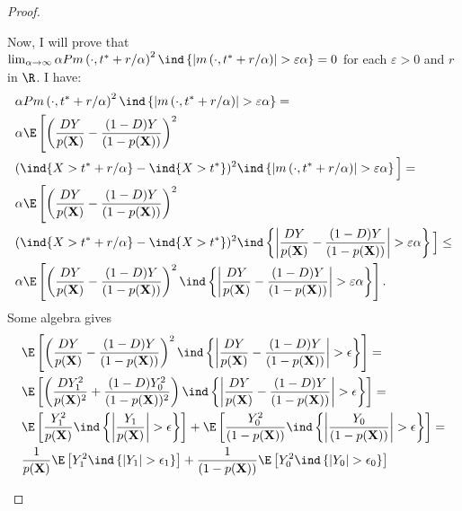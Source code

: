 {\begin{proof}
\begin{enumerate}
    Now, I will prove that $\lim _{\alpha \rightarrow \infty} \alpha P m\left(\cdot, t^* +r / \alpha\right)^2\ind \left\{\left|m\left(\cdot, t^*+r / \alpha\right)\right|>\varepsilon \alpha\right\}=0$ for each $\varepsilon>0$ and $r$ in $\R$. I have:
    \begin{align}
        & \alpha P m\left(\cdot, t^* +r / \alpha\right)^2 \ind\left\{\left|m\left(\cdot, t^*+r / \alpha\right)\right|>\varepsilon \alpha\right\} = \\
        & \alpha \E \left[ \left(\frac{DY}{p(\textbf{X})} - \frac{(1-D) Y}{(1-p(\textbf{X}))}\right)^2 \right. \\
        &(\ind\{X>t^*+r/ \alpha \} -\ind\{X>t^* \})^2 \ind\left\{\left|m\left(\cdot, t^*+r / \alpha\right)\right|>\varepsilon \alpha\right\} \Big] = \\
        &\alpha \E \left[ \left(\frac{DY}{p(\textbf{X})} - \frac{(1-D) Y}{(1-p(\textbf{X}))}\right)^2 \right. \\
        &(\ind\{X>t^*+r/ \alpha \} -\ind\{X>t^* \})^2
         \ind\left\{\left|\frac{DY}{p(\textbf{X})} - \frac{(1-D) Y}{(1-p(\textbf{X}))} \right|>\varepsilon \alpha\right\} \Big]\leq \\
        &\alpha \E \left[ \left(\frac{DY}{p(\textbf{X})} - \frac{(1-D) Y}{(1-p(\textbf{X}))}\right)^2 
         \ind\left\{\left|\frac{DY}{p(\textbf{X})} - \frac{(1-D) Y}{(1-p(\textbf{X}))} \right|>\varepsilon \alpha\right\} \right].
    \end{align}
    Some algebra gives
    \begin{align}
        & \E \left[ \left(\frac{DY}{p(\textbf{X})} - \frac{(1-D) Y}{(1-p(\textbf{X}))}\right)^2 \ind\left\{\left|\frac{DY}{p(\textbf{X})} - \frac{(1-D) Y}{(1-p(\textbf{X}))} \right|> \epsilon \right\} \right] = \\
        & \E \left[ \left(\frac{DY_1^2}{p(\textbf{X})^2} + \frac{(1-D) Y_0^2}{(1-p(\textbf{X}))^2}\right) \ind\left\{\left|\frac{DY}{p(\textbf{X})} - \frac{(1-D) Y}{(1-p(\textbf{X}))} \right|> \epsilon \right\} \right] = \\
        & \E \left[ \frac{Y_1^2}{p(\textbf{X})} \ind\left\{\left|\frac{Y_1}{p(\textbf{X})} \right|> \epsilon \right\} \right] + \E \left[  \frac{ Y_0^2}{(1-p(\textbf{X}))} \ind\left\{\left| \frac{ Y_0}{(1-p(\textbf{X}))} \right|> \epsilon \right\} \right] =\\
        & \frac{1}{p(\textbf{X})}\E \left[ Y_1^2 \ind\left\{\left|Y_1 \right|> \epsilon_1 \right\} \right] + \frac{ 1}{(1-p(\textbf{X}))}\E \left[  Y_0^2 \ind\left\{\left|  Y_0 \right|> \epsilon_0 \right\} \right]

\end{align}
\end{enumerate}
\end{proof}}

